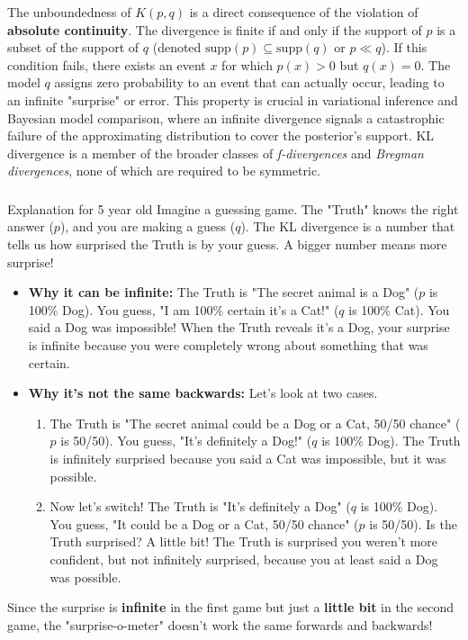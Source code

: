 \documentclass{article}
\begin{document}
The unboundedness of $K(p, q)$ is a direct consequence of the violation of \textbf{absolute continuity}. The divergence is finite if and only if the support of $p$ is a subset of the support of $q$ (denoted $\text{supp}(p) \subseteq \text{supp}(q)$ or $p \ll q$). If this condition fails, there exists an event $x$ for which $p(x) > 0$ but $q(x) = 0$. The model $q$ assigns zero probability to an event that can actually occur, leading to an infinite "surprise" or error. This property is crucial in variational inference and Bayesian model comparison, where an infinite divergence signals a catastrophic failure of the approximating distribution to cover the posterior's support. KL divergence is a member of the broader classes of \textit{f-divergences} and \textit{Bregman divergences}, none of which are required to be symmetric. 

\subsubsection*{\normalfont}{Explanation for 5 year old}
Imagine a guessing game. The "Truth" knows the right answer ($p$), and you are making a guess ($q$). The KL divergence is a number that tells us how surprised the Truth is by your guess. A bigger number means more surprise!

\begin{itemize}
    \item \textbf{Why it can be infinite:} The Truth is "The secret animal is a Dog" ($p$ is 100\% Dog). You guess, "I am 100\% certain it's a Cat!" ($q$ is 100\% Cat). You said a Dog was impossible! When the Truth reveals it's a Dog, your surprise is infinite because you were completely wrong about something that was certain.
    
    \item \textbf{Why it's not the same backwards:} Let's look at two cases.
    \begin{enumerate}
        \item The Truth is "The secret animal could be a Dog or a Cat, 50/50 chance" ($p$ is 50/50). You guess, "It's definitely a Dog!" ($q$ is 100\% Dog). The Truth is infinitely surprised because you said a Cat was impossible, but it was possible.
        
        \item Now let's switch! The Truth is "It's definitely a Dog" ($q$ is 100\% Dog). You guess, "It could be a Dog or a Cat, 50/50 chance" ($p$ is 50/50). Is the Truth surprised? A little bit! The Truth is surprised you weren't more confident, but not infinitely surprised, because you at least said a Dog was possible.
    \end{enumerate}
\end{itemize}
Since the surprise is \textbf{infinite} in the first game but just a \textbf{little bit} in the second game, the "surprise-o-meter" doesn't work the same forwards and backwards! 
\end{document}

